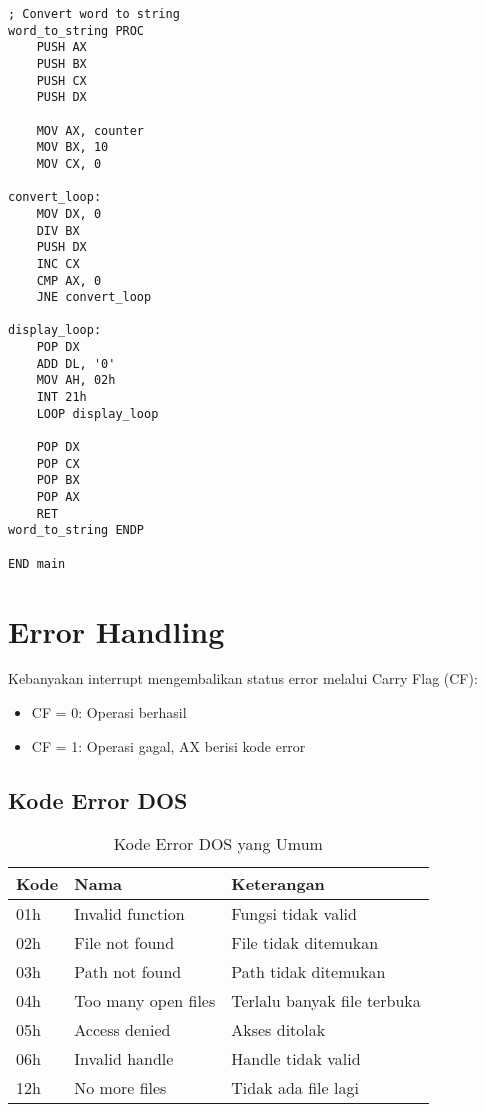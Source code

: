 \documentclass[../main.tex]{subfiles}
\begin{document}
\begin{lstlisting}[language={[x86masm]Assembler}, caption=Program Custom Interrupt Handler, label={lst:custom-interrupt}]
; Convert word to string
word_to_string PROC
    PUSH AX
    PUSH BX
    PUSH CX
    PUSH DX
    
    MOV AX, counter
    MOV BX, 10
    MOV CX, 0
    
convert_loop:
    MOV DX, 0
    DIV BX
    PUSH DX
    INC CX
    CMP AX, 0
    JNE convert_loop
    
display_loop:
    POP DX
    ADD DL, '0'
    MOV AH, 02h
    INT 21h
    LOOP display_loop
    
    POP DX
    POP CX
    POP BX
    POP AX
    RET
word_to_string ENDP

END main
            \end{lstlisting}

    \section{Error Handling}
        Kebanyakan interrupt mengembalikan status error melalui Carry Flag (CF):
        \begin{itemize}
            \item CF = 0: Operasi berhasil
            \item CF = 1: Operasi gagal, AX berisi kode error
        \end{itemize}

        \subsection{Kode Error DOS}
            \begin{table}[H]
                \centering
                \caption{Kode Error DOS yang Umum}
                \begin{tabular}{|p{1.5cm}|p{3cm}|p{8.5cm}|}
                    \hline
                    \textbf{Kode} & \textbf{Nama} & \textbf{Keterangan} \\
                    \hline
                    01h & Invalid function & Fungsi tidak valid \\
                    \hline
                    02h & File not found & File tidak ditemukan \\
                    \hline
                    03h & Path not found & Path tidak ditemukan \\
                    \hline
                    04h & Too many open files & Terlalu banyak file terbuka \\
                    \hline
                    05h & Access denied & Akses ditolak \\
                    \hline
                    06h & Invalid handle & Handle tidak valid \\
                    \hline
                    12h & No more files & Tidak ada file lagi \\
                    \hline
                \end{tabular}
            \end{table}
\end{document}
